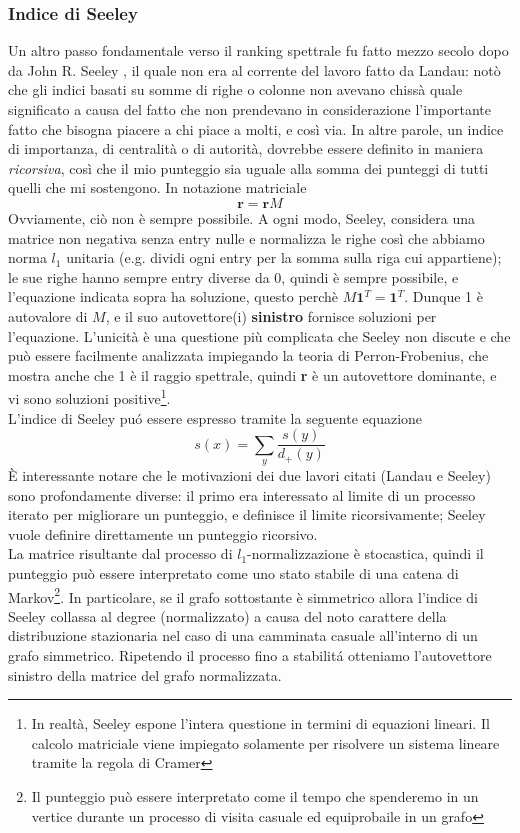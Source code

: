\subsubsection{Indice di Seeley}
Un altro passo fondamentale verso il ranking spettrale fu fatto mezzo secolo dopo da John R. Seeley %
, il quale non era al corrente del lavoro fatto da Landau: notò che gli indici basati su somme di righe o colonne non avevano chissà quale significato a causa del fatto che non prendevano in considerazione l'importante fatto che bisogna piacere a chi piace a molti, e così via. In altre parole, un indice di importanza, di centralità o di autorità, dovrebbe essere definito in maniera \textit{ricorsiva}, così che il mio punteggio sia uguale alla somma dei punteggi di tutti quelli che mi sostengono. In notazione matriciale
\begin{equation*}
    \textbf{r} = \textbf{r}M
\end{equation*}
Ovviamente, ciò non è sempre possibile. A ogni modo, Seeley, considera una matrice non negativa senza entry nulle e normalizza le righe così che abbiamo norma $l_1$ unitaria (e.g. dividi ogni entry per la somma sulla riga cui appartiene); le sue righe hanno sempre entry diverse da 0, quindi è sempre possibile, e l'equazione indicata sopra ha soluzione, questo perchè $M\textbf{1}^T = \textbf{1}^T$. Dunque 1 è autovalore di $M$, e il suo autovettore(i) \textbf{sinistro} fornisce soluzioni per l'equazione. L'unicità è una questione più complicata che Seeley non discute e che può essere facilmente analizzata impiegando la teoria di Perron-Frobenius, che mostra anche che 1 è il raggio spettrale, quindi \textbf{r} è  un autovettore dominante, e vi sono soluzioni positive\footnote{In realtà, Seeley espone l'intera questione in termini di equazioni lineari. Il calcolo matriciale viene impiegato solamente per risolvere un sistema lineare tramite la regola di Cramer}.\\
L'indice di Seeley puó essere espresso tramite la seguente equazione
\begin{equation}
    s(x) = \sum_y{\frac{s(y)}{d_+(y)}}
\end{equation}
È interessante notare che le motivazioni dei due lavori citati (Landau e Seeley) sono profondamente diverse: il primo era interessato al limite di un processo iterato per migliorare un punteggio, e definisce il limite ricorsivamente; Seeley vuole definire direttamente un punteggio ricorsivo.\\
La matrice risultante dal processo di $l_1$-normalizzazione è stocastica, quindi il punteggio può essere interpretato come uno stato stabile di una catena di Markov\footnote{Il punteggio può essere interpretato come il tempo che spenderemo in un vertice durante un processo di visita casuale ed equiprobaile in un grafo}. In particolare, se il grafo sottostante è simmetrico allora l'indice di Seeley collassa al degree (normalizzato) a causa del noto carattere della distribuzione stazionaria nel caso di una camminata casuale all'interno di un grafo simmetrico. Ripetendo il processo fino a stabilitá otteniamo l'autovettore sinistro della matrice del grafo normalizzata.
